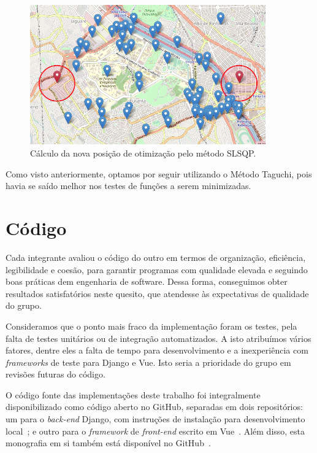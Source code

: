 \documentclass[]{politex}
\begin{document}
\begin{figure}[H]
    \centering
    \includegraphics[width=4in]{imagens/slsqp-exemplo}
    \caption{Cálculo da nova posição de otimização pelo método SLSQP.}
    \label{fig:slsqp_exemplo}
\end{figure}

Como visto anteriormente, optamos por seguir utilizando o Método Taguchi, pois
havia se saído melhor nos testes de funções a serem minimizadas.



\section{Código}

Cada integrante avaliou o código do outro em termos de organização, eficiência,
legibilidade e coesão, para garantir programas com qualidade elevada e seguindo
boas práticas dem engenharia de software. Dessa forma, conseguimos obter
resultados satisfatórios neste quesito, que atendesse às expectativas de
qualidade do grupo.

Consideramos que o ponto mais fraco da implementação foram os testes, pela falta
de testes unitários ou de integração automatizados. A isto atribuímos vários
fatores, dentre eles a falta de tempo para desenvolvimento e a inexperiência com
\textit{frameworks} de teste para Django e Vue. Isto seria a prioridade do grupo
em revisões futuras do código.

O código fonte das implementações deste trabalho foi integralmente
disponibilizado como código aberto no GitHub, separadas em dois repositórios: um
para o \textit{back-end} Django, com instruções de instalação para
desenvolvimento local~\cite{repo-django}; e outro para o \textit{framework} de
\textit{front-end} escrito em Vue~\cite{repo-vue}. Além disso, esta monografia
em si também está disponível no GitHub~\cite{repo-tcc}.
\end{document}
